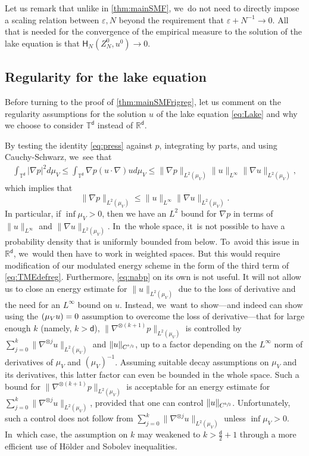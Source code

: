 \documentclass[JEP,XML,SOM,Unicode,published]{cedram}
\theoremstyle{plain}
\theoremstyle{definition}
\let\div\relax
\DeclareMathOperator{\div}{\mathrm{div}}
\newcommand{\R}{{\mathbb{R}}}
\newcommand{\T}{{\mathbb{T}}}
\let\vep\varepsilon
\let\nab\nabla
\let\uz Z
\newcommand{\Hr}{\mathsf{H}}
\renewcommand{\d}{\mathsf{d}}
\begin{document}
Let us remark that unlike in \cref{thm:mainSMF}, we~do not need to directly impose a scaling relation between $\vep, N$ beyond the requirement that $\vep + N^{-1}\to 0$. All that is needed for the convergence of the empirical measure to the solution of the lake equation is that $\Hr_{N}(\uz_N^0,u^0)\to 0$.

\subsection{Regularity for the lake equation}\label{ssec:appregLake}
Before turning to the proof of \cref{thm:mainSMFrigreg}, let us comment on the regularity assumptions for the solution $u$ of the lake equation \eqref{eq:Lake} and why we choose to consider $\T^\d$ instead of $\R^\d$.

By testing the identity \eqref{eq:press} against $p$, integrating by parts, and using Cauchy-Schwarz, we~see that
\begin{align*}
\int_{\T^\d}|\nab p|^2 d\mu_V \le \int_{\T^\d}\nab p (u\cdot\nab)u d\mu_V \le \|\nab p\|_{L^2(\mu_V)} \|u\|_{L^\infty} \|\nab u\|_{L^2(\mu_V)},
\end{align*}
which implies that
\begin{equation}\label{eq:nabp}
\|\nab p\|_{L^2(\mu_V)} \le \|u\|_{L^\infty}\|\nab u\|_{L^2(\mu_V)}.
\end{equation}
In particular, if $\inf\mu_V >0$, then we have an $L^2$ bound for $\nab p$ in terms of $\|u\|_{L^\infty}$ and $\|\nab u\|_{L^2(\mu_V)}$. In~the whole space, it~is not possible to have a probability density that is uniformly bounded from below. To~avoid this issue in $\R^\d$, we~would then have to work in weighted spaces. But this would require modification of our modulated energy scheme in the form of the third term of \eqref{eq:TMEdefreg}. Furthermore, \eqref{eq:nabp} on its own is not useful. It will not allow us to close an energy estimate for $\|u\|_{L^2(\mu_V)}$ due to the loss of derivative and the need for an $L^\infty$ bound on $u$. Instead, we~want to show---and indeed can show using the $\div(\mu_Vu)=0$ assumption to overcome the loss of derivative---that for large enough $k$ (namely, $k>\d$), $\|\nab^{\otimes(k+1)}p\|_{L^2(\mu_V)}$ is controlled by $\sum_{j=0}^k\|\nab^{\otimes j} u\|_{L^2(\mu_V)}$ and $\|u\|_{C^{\sfrac{k}{2}}}$, up to a factor depending on the $L^\infty$ norm of derivatives of $\mu_V$ and $(\mu_V)^{-1}$. Assuming suitable decay assumptions on $\mu_V$ and its derivatives, this latter factor can even be bounded in the whole space. Such a bound for $\|\nab^{\otimes(k+1)}p\|_{L^2(\mu_V)}$ is acceptable for an energy estimate for $\sum_{j=0}^k\|\nab^{\otimes j}u\|_{L^2(\mu_V)}$, provided that one can control $\|u\|_{C^{\sfrac{k}{2}}}$. Unfortunately, such a control does not follow from $\sum_{j=0}^k\|\nab^{\otimes j}u\|_{L^2(\mu_V)}$ unless $\inf\mu_V>0$. In~which case, the assumption on $k$ may weakened to $k>\frac{\d}{2}+1$ through a more efficient use of Hölder and Sobolev inequalities.
\end{document}

